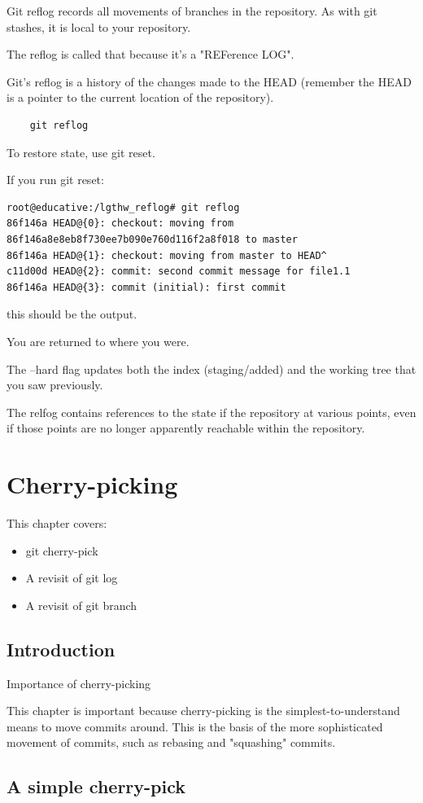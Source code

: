 \documentclass{report}
\begin{document}
Git reflog records all movements of branches in the repository. As with git stashes, it is local to your repository.

The reflog is called that because it's a "REFerence LOG".

Git's reflog is a history of the changes made to the HEAD (remember the HEAD is a pointer to the current location of the repository).

\begin{lstlisting}
    git reflog
\end{lstlisting}

To restore state, use git reset.

If you run git reset:

\begin{lstlisting}
root@educative:/lgthw_reflog# git reflog
86f146a HEAD@{0}: checkout: moving from 86f146a8e8eb8f730ee7b090e760d116f2a8f018 to master
86f146a HEAD@{1}: checkout: moving from master to HEAD^
c11d00d HEAD@{2}: commit: second commit message for file1.1
86f146a HEAD@{3}: commit (initial): first commit
\end{lstlisting}
this should be the output.

You are returned to where you were.

The --hard flag updates both the index (staging/added) and the working tree that you saw previously.

The relfog contains references to the state if the repository at various points, even if those points are no longer apparently reachable within the repository.

\chapter{Cherry-picking}

This chapter covers:
\begin{itemize}
    \item git cherry-pick
    \item A revisit of git log
    \item A revisit of git branch
\end{itemize}

\section{Introduction}

Importance of cherry-picking

This chapter is important because cherry-picking is the simplest-to-understand means to move commits around. This is the basis of the more sophisticated movement of commits, such as rebasing and "squashing" commits.

\section{A simple cherry-pick}
\end{document}
